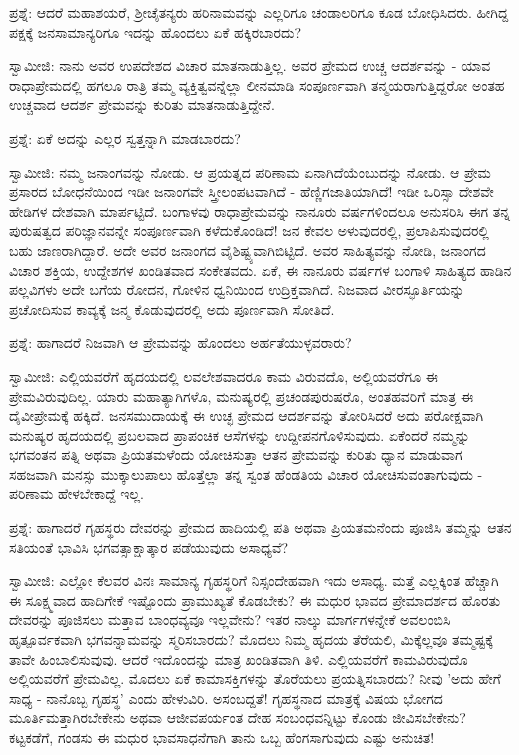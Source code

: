 ಪ್ರಶ್ನೆ: ಆದರೆ ಮಹಾಶಯರೆ, ಶ‍್ರೀಚೈತನ್ಯರು ಹರಿನಾಮವನ್ನು ಎಲ್ಲರಿಗೂ ಚಂಡಾಲರಿಗೂ ಕೂಡ ಬೋಧಿಸಿದರು. ಹೀಗಿದ್ದ ಪಕ್ಷಕ್ಕೆ ಜನಸಾಮಾನ್ಯರಿಗೂ ಇದನ್ನು ಹೊಂದಲು ಏಕೆ ಹಕ್ಕಿರಬಾರದು?

ಸ್ವಾಮೀಜಿ: ನಾನು ಅವರ ಉಪದೇಶದ ವಿಚಾರ ಮಾತನಾಡುತ್ತಿಲ್ಲ. ಅವರ ಪ್ರೇಮದ ಉಚ್ಚ ಆದರ್ಶವನ್ನು - ಯಾವ ರಾಧಾಪ್ರೇಮದಲ್ಲಿ ಹಗಲೂ ರಾತ್ರಿ ತಮ್ಮ ವ್ಯಕ್ತಿತ್ವವನ್ನೆಲ್ಲಾ ಲೀನಮಾಡಿ ಸಂಪೂರ್ಣವಾಗಿ ತನ್ಮಯರಾಗುತ್ತಿದ್ದರೋ ಅಂತಹ ಉಚ್ಚವಾದ ಆದರ್ಶ ಪ್ರೇಮವನ್ನು ಕುರಿತು ಮಾತನಾಡುತ್ತಿದ್ದೇನೆ.

ಪ್ರಶ್ನೆ: ಏಕೆ ಅದನ್ನು ಎಲ್ಲರ ಸ್ವತ್ತನ್ನಾಗಿ ಮಾಡಬಾರದು?

ಸ್ವಾಮೀಜಿ: ನಮ್ಮ ಜನಾಂಗವನ್ನು ನೋಡು. ಆ ಪ್ರಯತ್ನದ ಪರಿಣಾಮ ಏನಾಗಿದೆಯೆಂಬುದನ್ನು ನೋಡು. ಆ ಪ್ರೇಮ ಪ್ರಸಾರದ ಬೋಧನೆಯಿಂದ ಇಡೀ ಜನಾಂಗವೇ ಸ್ತ್ರೀಲಂಪಟವಾಗಿದೆ - ಹೆಣ್ಣಿಗಜಾತಿಯಾಗಿದೆ! ಇಡೀ ಒರಿಸ್ಸಾ ದೇಶವೇ ಹೇಡಿಗಳ ದೇಶವಾಗಿ ಮಾರ್ಪಟ್ಟಿದೆ. ಬಂಗಾಳವು ರಾಧಾಪ್ರೇಮವನ್ನು ನಾನೂರು ವರ್ಷಗಳಿಂದಲೂ ಅನುಸರಿಸಿ ಈಗ ತನ್ನ ಪುರುಷತ್ವದ ಪರಿಜ್ಞಾನವನ್ನೇ ಸಂಪೂರ್ಣವಾಗಿ ಕಳೆದುಕೊಂಡಿದೆ! ಜನ ಕೇವಲ ಅಳುವುದರಲ್ಲಿ, ಪ್ರಲಾಪಿಸುವುದರಲ್ಲಿ ಬಹು ಜಾಣರಾಗಿದ್ದಾರೆ. ಅದೇ ಅವರ ಜನಾಂಗದ ವೈಶಿಷ್ಟ್ಯವಾಗಿಬಿಟ್ಟಿದೆ. ಅವರ ಸಾಹಿತ್ಯವನ್ನು ನೋಡಿ, ಜನಾಂಗದ ವಿಚಾರ ಶಕ್ತಿಯ, ಉದ್ದೇಶಗಳ ಖಂಡಿತವಾದ ಸಂಕೇತವದು. ಏಕೆ, ಈ ನಾನೂರು ವರ್ಷಗಳ ಬಂಗಾಳಿ ಸಾಹಿತ್ಯದ ಹಾಡಿನ ಪಲ್ಲವಿಗಳು ಅದೇ ಬಗೆಯ ರೋದನ, ಗೋಳಿನ ಧ್ವನಿಯಿಂದ ಉದ್ರಿಕ್ತವಾಗಿದೆ. ನಿಜವಾದ ವೀರಸ್ಫೂರ್ತಿಯನ್ನು ಪ್ರಚೋದಿಸುವ ಕಾವ್ಯಕ್ಕೆ ಜನ್ಮ ಕೊಡುವುದರಲ್ಲಿ ಅದು ಪೂರ್ಣವಾಗಿ ಸೋತಿದೆ.

ಪ್ರಶ್ನೆ: ಹಾಗಾದರೆ ನಿಜವಾಗಿ ಆ ಪ್ರೇಮವನ್ನು ಹೊಂದಲು ಅರ್ಹತೆಯುಳ್ಳವರಾರು?

ಸ್ವಾಮೀಜಿ: ಎಲ್ಲಿಯವರೆಗೆ ಹೃದಯದಲ್ಲಿ ಲವಲೇಶವಾದರೂ ಕಾಮ ವಿರುವದೊ, ಅಲ್ಲಿಯವರೆಗೂ ಈ ಪ್ರೇಮವಿರುವುದಿಲ್ಲ. ಯಾರು ಮಹಾತ್ಯಾಗಿಗಳೊ, ಮನುಷ್ಯರಲ್ಲಿ ಪ್ರಚಂಡಪುರುಷರೊ, ಅಂತಹವರಿಗೆ ಮಾತ್ರ ಈ ದೈವೀಪ್ರೇಮಕ್ಕೆ ಹಕ್ಕಿದೆ. ಜನಸಮುದಾಯಕ್ಕೆ ಈ ಉಚ್ಛ ಪ್ರೇಮದ ಆದರ್ಶವನ್ನು ತೋರಿಸಿದರೆ ಅದು ಪರೋಕ್ಷವಾಗಿ ಮನುಷ್ಯರ ಹೃದಯದಲ್ಲಿ ಪ್ರಬಲವಾದ ಪ್ರಾಪಂಚಿಕ ಆಸೆಗಳನ್ನು ಉದ್ದೀಪನಗೊಳಿಸುವುದು. ಏಕೆಂದರೆ ನಮ್ಮನ್ನು ಭಗವಂತನ ಪತ್ನಿ ಅಥವಾ ಪ್ರಿಯತಮಳೆಂದು ಯೋಚಿಸುತ್ತಾ ಆತನ ಪ್ರೇಮವನ್ನು ಕುರಿತು ಧ್ಯಾನ ಮಾಡುವಾಗ ಸಹಜವಾಗಿ ಮನಸ್ಸು ಮುಕ್ಕಾಲುಪಾಲು ಹೊತ್ತೆಲ್ಲಾ ತನ್ನ ಸ್ವಂತ ಹೆಂಡತಿಯ ವಿಚಾರ ಯೋಚಿಸುವಂತಾಗುವುದು - ಪರಿಣಾಮ ಹೇಳಬೇಕಾದ್ದೆ ಇಲ್ಲ.

ಪ್ರಶ್ನೆ: ಹಾಗಾದರೆ ಗೃಹಸ್ಥರು ದೇವರನ್ನು ಪ್ರೇಮದ ಹಾದಿಯಲ್ಲಿ ಪತಿ ಅಥವಾ ಪ್ರಿಯತಮನೆಂದು ಪೂಜಿಸಿ ತಮ್ಮನ್ನು ಆತನ ಸತಿಯಂತೆ ಭಾವಿಸಿ ಭಗವತ್ಸಾಕ್ಷಾತ್ಕಾರ ಪಡೆಯುವುದು ಅಸಾಧ್ಯವೆ?

ಸ್ವಾಮೀಜಿ: ಎಲ್ಲೋ ಕೆಲವರ ವಿನಃ ಸಾಮಾನ್ಯ ಗೃಹಸ್ಥರಿಗೆ ನಿಸ್ಸಂದೇಹವಾಗಿ ಇದು ಅಸಾಧ್ಯ. ಮತ್ತೆ ಎಲ್ಲಕ್ಕಿಂತ ಹೆಚ್ಚಾಗಿ ಈ ಸೂಕ್ಷ್ಮವಾದ ಹಾದಿಗೇಕೆ ಇಷ್ಟೊಂದು ಪ್ರಾಮುಖ್ಯತೆ ಕೊಡಬೇಕು? ಈ ಮಧುರ ಭಾವದ ಪ್ರೇಮಾದರ್ಶದ ಹೊರತು ದೇವರನ್ನು ಪೂಜಿಸಲು ಮತ್ತಾವ ಬಾಂಧವ್ಯವೂ ಇಲ್ಲವೇನು? ಇತರ ನಾಲ್ಕು ಮಾರ್ಗಗಳನ್ನೇಕೆ ಅವಲಂಬಿಸಿ ಹೃತ್ಪೂರ್ವಕವಾಗಿ ಭಗವನ್ನಾಮವನ್ನು ಸ್ಮರಿಸಬಾರದು? ಮೊದಲು ನಿಮ್ಮ ಹೃದಯ ತೆರೆಯಲಿ, ಮಿಕ್ಕೆಲ್ಲವೂ ತಮ್ಮಷ್ಟಕ್ಕೆ ತಾವೇ ಹಿಂಬಾಲಿಸುವುವು. ಆದರೆ ಇದೊಂದನ್ನು ಮಾತ್ರ ಖಂಡಿತವಾಗಿ ತಿಳಿ. ಎಲ್ಲಿಯವರೆಗೆ ಕಾಮವಿರುವುದೊ ಅಲ್ಲಿಯವರೆಗೆ ಪ್ರೇಮವಿಲ್ಲ. ಮೊದಲು ಏಕೆ ಕಾಮಾಸಕ್ತಿಗಳನ್ನು ತೊರೆಯಲು ಪ್ರಯತ್ನಿಸಬಾರದು? ನೀವು 'ಅದು ಹೇಗೆ ಸಾಧ್ಯ - ನಾನೊಬ್ಬ ಗೃಹಸ್ಥ' ಎಂದು ಹೇಳುವಿರಿ. ಅಸಂಬದ್ದತೆ! ಗೃಹಸ್ಥನಾದ ಮಾತ್ರಕ್ಕೆ ವಿಷಯ ಭೋಗದ ಮೂರ್ತಿಮತ್ತಾಗಿರಬೇಕೇನು ಅಥವಾ ಆಜೀವಪರ್ಯಂತ ದೇಹ ಸಂಬಂಧವನ್ನಿಟ್ಟು ಕೊಂಡು ಜೀವಿಸಬೇಕೇನು? ಕಟ್ಟಕಡೆಗೆ, ಗಂಡಸು ಈ ಮಧುರ ಭಾವಸಾಧನೆಗಾಗಿ ತಾನು ಒಬ್ಬ ಹೆಂಗಸಾಗುವುದು ಎಷ್ಟು ಅನುಚಿತ!


